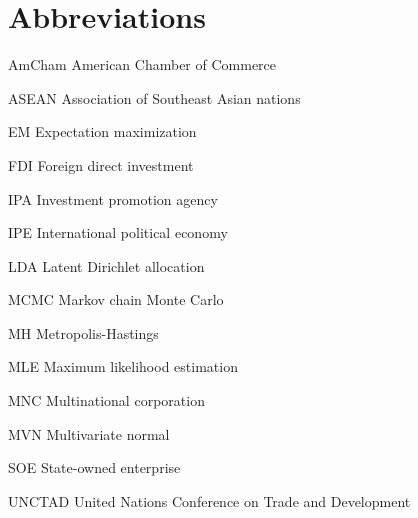\abbreviations





\section*{Abbreviations}

\begin{symbollist}
  \item[AmCham] American Chamber of Commerce
  \item[ASEAN] Association of Southeast Asian nations
  \item[EM] Expectation maximization
	\item[FDI] Foreign direct investment
  \item[IPA] Investment promotion agency
  \item[IPE] International political economy
  \item[LDA] Latent Dirichlet allocation
	\item[MCMC] Markov chain Monte Carlo
  \item[MH] Metropolis-Hastings
	\item[MLE] Maximum likelihood estimation
  \item[MNC] Multinational corporation
  \item[MVN] Multivariate normal
  \item[SOE] State-owned enterprise
  \item[UNCTAD] United Nations Conference on Trade and Development
\end{symbollist}
